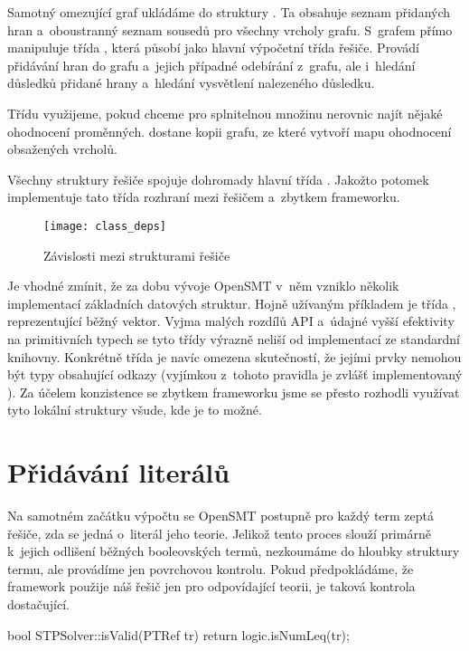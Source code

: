 Samotný omezující graf ukládáme do struktury . Ta obsahuje seznam přidaných hran a~oboustranný seznam sousedů pro všechny vrcholy grafu. S~grafem přímo manipuluje třída , která působí jako hlavní výpočetní třída řešiče. Provádí přidávání hran do grafu a~jejich případné odebírání z~grafu, ale i~hledání důsledků přidané hrany a~hledání vysvětlení nalezeného důsledku.

Třídu  využijeme, pokud chceme pro splnitelnou množinu nerovnic najít nějaké ohodnocení proměnných.  dostane kopii grafu, ze které vytvoří mapu ohodnocení obsažených vrcholů.

Všechny struktury řešiče spojuje dohromady hlavní třída . Jakožto potomek  implementuje tato třída rozhraní mezi řešičem a~zbytkem frameworku. %

\begin{figure}
	\centering
	\texttt{[image: class\_deps]}
	\caption{Závislosti mezi strukturami řešiče}
\end{figure}

Je vhodné zmínit, že za dobu vývoje OpenSMT v~něm vzniklo několik implementací základních datových struktur. Hojně užívaným příkladem je třída , reprezentující běžný vektor. Vyjma malých rozdílů API a~údajné vyšší efektivity na primitivních typech se tyto třídy výrazně neliší od implementací ze standardní knihovny. Konkrétně třída  je navíc omezena skutečností, že jejími prvky nemohou být typy obsahující odkazy (vyjímkou z~tohoto pravidla je zvlášť implementovaný ). Za účelem konzistence se zbytkem frameworku jsme se přesto rozhodli využívat tyto lokální struktury všude, kde je to možné. 
\newpage
\section{Přidávání literálů}\label{add}

Na samotném začátku výpočtu se OpenSMT postupně pro každý term zeptá řešiče, zda se jedná o~literál jeho teorie. Jelikož tento proces slouží primárně k~jejich odlišení běžných booleovských termů, nezkoumáme do hloubky struktury termu, ale provádíme jen povrchovou kontrolu. Pokud předpokládáme, že framework použije náš řešič jen pro odpovídající teorii, je taková kontrola dostačující.
\begin{code}
bool STPSolver::isValid(PTRef tr) { return logic.isNumLeq(tr); }
\end{code}

